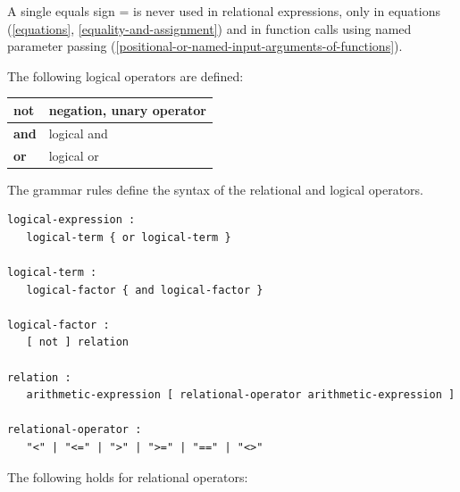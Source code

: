 \documentclass[10pt,a4paper]{report}
\begin{document}
A single equals sign = is never used in relational expressions, only in
equations (\ref{equations}, \ref{equality-and-assignment}) and in function calls using named
parameter passing (\ref{positional-or-named-input-arguments-of-functions}).

The following logical operators are defined:

\begin{longtable}[]{@{}ll@{}}
\textbf{not} & negation, unary operator\\ \hline
\textbf{and} & logical and\\ \hline
\textbf{or} & logical or\\ \hline
\end{longtable}

The grammar rules define the syntax of the relational and logical
operators.

\begin{lstlisting}[language=grammar]
logical-expression :
   logical-term { or logical-term }
  
logical-term :
   logical-factor { and logical-factor }
   
logical-factor :
   [ not ] relation
   
relation :
   arithmetic-expression [ relational-operator arithmetic-expression ]
   
relational-operator :
   "<" | "<=" | ">" | ">=" | "==" | "<>"
\end{lstlisting}

The following holds for relational operators:
\end{document}
